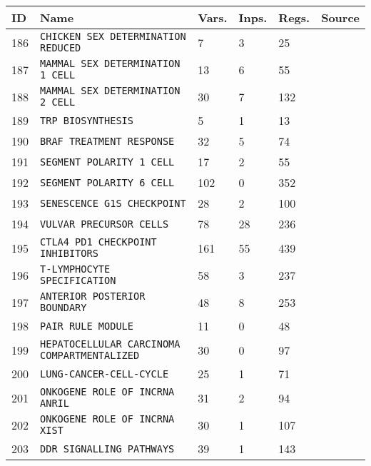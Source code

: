 \documentclass{article}
\begin{document}
\begin{center}
	\begin{tabular}{ | C{16pt} | C{149pt} | C{25pt} | C{25pt} | C{25pt} | C{36pt} | }
		\hline
		ID & Name & Vars. & Inps. & Regs. & Source \\ 	 	
		 & \texttt{CHICKEN SEX DETERMINATION REDUCED} & 7 & 3 & 25 & \cite{bbm-185-186, ginsim} \\
		 & \texttt{MAMMAL SEX DETERMINATION 1 CELL} & 13 & 6 & 55 & \cite{bbm-187-188, ginsim} \\
		 & \texttt{MAMMAL SEX DETERMINATION 2 CELL} & 30 & 7 & 132 & \cite{bbm-187-188, ginsim} \\
		 & \texttt{TRP BIOSYNTHESIS} & 5 & 1 & 13 & \cite{bbm-189, ginsim} \\
		 & \texttt{BRAF TREATMENT RESPONSE} & 32 & 5 & 74 & \cite{bbm-190, ginsim} \\
		 & \texttt{SEGMENT POLARITY 1 CELL} & 17 & 2 & 55 & \cite{bbm-191-192, ginsim} \\
		 & \texttt{SEGMENT POLARITY 6 CELL} & 102 & 0 & 352 & \cite{bbm-191-192, ginsim} \\
		 & \texttt{SENESCENCE G1S CHECKPOINT} & 28 & 2 & 100 & \cite{bbm-193, ginsim} \\
		 & \texttt{VULVAR PRECURSOR CELLS} & 78 & 28 & 236 & \cite{bbm-194, ginsim} \\
		 & \texttt{CTLA4 PD1 CHECKPOINT INHIBITORS} & 161 & 55 & 439 & \cite{bbm-195, ginsim} \\
		 & \texttt{T-LYMPHOCYTE SPECIFICATION} & 58 & 3 & 237 & \cite{bbm-196, ginsim, biomodels} \\
		 & \texttt{ANTERIOR POSTERIOR BOUNDARY} & 48 & 8 & 253 & \cite{bbm-197, ginsim} \\
		 & \texttt{PAIR RULE MODULE} & 11 & 0 & 48 & \cite{bbm-198, ginsim} \\
		 & \texttt{HEPATOCELLULAR CARCINOMA COMPARTMENTALIZED} & 30 & 0 & 97 & \cite{bbm-199} \\
		 & \texttt{LUNG-CANCER-CELL-CYCLE} & 25 & 1 & 71 & \cite{bbm-200} \\
		 & \texttt{ONKOGENE ROLE OF INCRNA ANRIL} & 31 & 2 & 94 & \cite{bbm-201} \\
		 & \texttt{ONKOGENE ROLE OF INCRNA XIST} & 30 & 1 & 107 & \cite{bbm-202} \\
		 & \texttt{DDR SIGNALLING PATHWAYS} & 39 & 1 & 143 & \cite{bbm-203} \\

\end{tabular}
\end{center}
\end{document}
